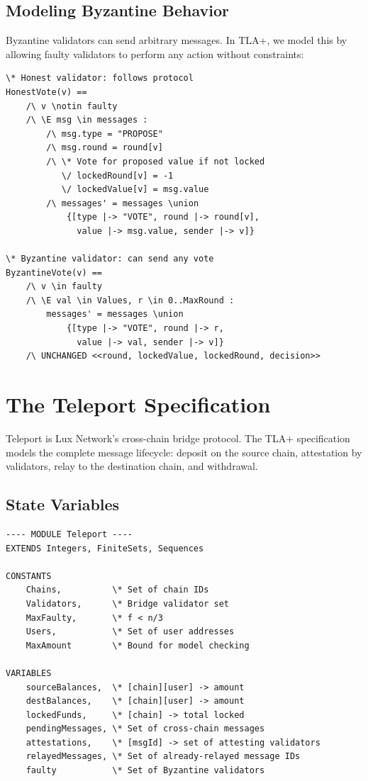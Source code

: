 \documentclass[11pt,a4paper]{article}
\begin{document}
\subsection{Modeling Byzantine Behavior}

Byzantine validators can send arbitrary messages. In TLA+, we model this by allowing
faulty validators to perform any action without constraints:

\begin{lstlisting}[language=TLA,caption={Byzantine behavior model}]
\* Honest validator: follows protocol
HonestVote(v) ==
    /\ v \notin faulty
    /\ \E msg \in messages :
        /\ msg.type = "PROPOSE"
        /\ msg.round = round[v]
        /\ \* Vote for proposed value if not locked
           \/ lockedRound[v] = -1
           \/ lockedValue[v] = msg.value
        /\ messages' = messages \union
            {[type |-> "VOTE", round |-> round[v],
              value |-> msg.value, sender |-> v]}

\* Byzantine validator: can send any vote
ByzantineVote(v) ==
    /\ v \in faulty
    /\ \E val \in Values, r \in 0..MaxRound :
        messages' = messages \union
            {[type |-> "VOTE", round |-> r,
              value |-> val, sender |-> v]}
    /\ UNCHANGED <<round, lockedValue, lockedRound, decision>>
\end{lstlisting}

\section{The Teleport Specification}

Teleport is Lux Network's cross-chain bridge protocol. The TLA+ specification models
the complete message lifecycle: deposit on the source chain, attestation by validators,
relay to the destination chain, and withdrawal.

\subsection{State Variables}

\begin{lstlisting}[language=TLA,caption={Teleport state variables}]
---- MODULE Teleport ----
EXTENDS Integers, FiniteSets, Sequences

CONSTANTS
    Chains,          \* Set of chain IDs
    Validators,      \* Bridge validator set
    MaxFaulty,       \* f < n/3
    Users,           \* Set of user addresses
    MaxAmount        \* Bound for model checking

VARIABLES
    sourceBalances,  \* [chain][user] -> amount
    destBalances,    \* [chain][user] -> amount
    lockedFunds,     \* [chain] -> total locked
    pendingMessages, \* Set of cross-chain messages
    attestations,    \* [msgId] -> set of attesting validators
    relayedMessages, \* Set of already-relayed message IDs
    faulty           \* Set of Byzantine validators
\end{lstlisting}
\end{document}
